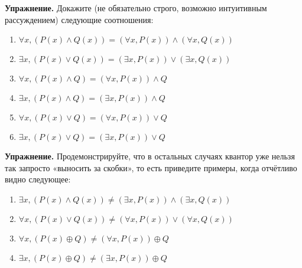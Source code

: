 {\bfseries Упражнение.} Докажите (не обязательно строго, возможно интуитивным рассуждением) следующие соотношения:

\begin{enumerate}
\item   $\forall x, (P(x) \wedge Q(x)) = (\forall x, P(x))\wedge (\forall x, Q(x))$
\item   $\exists x, (P(x) \vee Q(x)) = (\exists x, P(x))\vee (\exists x, Q(x))$
\item   $\forall x, (P(x) \wedge Q) = (\forall x, P(x))\wedge Q$
\item   $\exists x, (P(x) \wedge Q) = (\exists x, P(x))\wedge Q$
\item   $\forall x, (P(x) \vee Q) = (\forall x, P(x))\vee Q$
\item   $\exists x, (P(x) \vee Q) = (\exists x, P(x))\vee Q$
\end{enumerate}

{\bfseries Упражнение.} Продемонстрируйте, что в остальных случаях квантор уже нельзя так запросто «выносить за скобки», то есть приведите примеры, когда отчётливо видно следующее:

\begin{enumerate}
\item   $\exists x,(P(x)\wedge Q(x))\not=(\exists x, P(x))\wedge (\exists x,Q(x))$
\item   $\forall x, (P(x) \vee Q(x)) \not= (\forall x, P(x))\vee (\forall x, Q(x))$
\item   $\forall x, (P(x) \oplus Q) \not= (\forall x, P(x))\oplus Q$
\item   $\exists x, (P(x) \oplus Q) \not= (\exists x, P(x))\oplus Q$
\end{enumerate}
